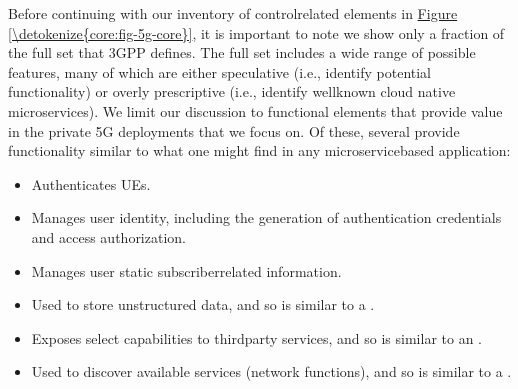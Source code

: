 \documentclass[a4paper,11pt,english]{sphinxmanual}
\begin{document}
\sphinxAtStartPar
Before continuing with our inventory of control\sphinxhyphen{}related elements in
\hyperref[\detokenize{core:fig-5g-core}]{Figure \ref{\detokenize{core:fig-5g-core}}}, it is important to note we show
only a fraction of the full set that 3GPP defines. The full set
includes a wide range of possible features, many of which are either
speculative (i.e., identify potential functionality) or overly
prescriptive (i.e., identify well\sphinxhyphen{}known cloud native microservices).
We limit our discussion to functional elements that provide value in
the private 5G deployments that we focus on. Of these, several provide
functionality similar to what one might find in any microservice\sphinxhyphen{}based
application:
\begin{itemize}
\item {} 
\sphinxAtStartPar
{} Authenticates UEs.

\item {} 
\sphinxAtStartPar
{} Manages user identity, including
the generation of authentication credentials and access authorization.

\item {} 
\sphinxAtStartPar
{} Manages user static
subscriber\sphinxhyphen{}related information.

\item {} 
\sphinxAtStartPar
{} Used to store
unstructured data, and so is similar to a .

\item {} 
\sphinxAtStartPar
{} Exposes select capabilities to
third\sphinxhyphen{}party services, and so is similar to an .

\item {} 
\sphinxAtStartPar
{} Used to discover available services
(network functions), and so is similar to a .

\end{itemize}
\end{document}
